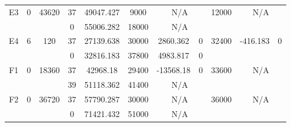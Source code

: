 \begin{sidewaystable}
\begin{tabular}{c||c|c||c|c|c|c|c||c|c|c}
         &
        
      \\
      \hline
      \multirow{2}{*}{E3} &
      \multirow{2}{*}{0} &
      \multirow{2}{*}{43620} &
      37 &
      49047.427 &
      9000 &
        \multicolumn{2}{|c||}{N/A} &
      \multirow{2}{*}{12000} &
        \multicolumn{2}{c}{\multirow{2}{*}{N/A}}
      \\
      \cline{4-8}
       &
       &
       &
      0 &
      55006.282 &
      18000 &
        \multicolumn{2}{|c||}{N/A} &
      
        
      \\
      \hline
      \multirow{2}{*}{E4} &
      \multirow{2}{*}{6} &
      \multirow{2}{*}{120} &
      37 &
      27139.638 &
      30000 &
        2860.362 &
        0 &
      \multirow{2}{*}{32400} &
        \multirow{2}{*}{-416.183} &
        \multirow{2}{*}{0}
      \\
      \cline{4-8}
       &
       &
       &
      0 &
      32816.183 &
      37800 &
        4983.817 &
        0 &
      
         &
        
      \\
      \hline
      \multirow{2}{*}{F1} &
      \multirow{2}{*}{0} &
      \multirow{2}{*}{18360} &
      37 &
      42968.18 &
      29400 &
        -13568.18 &
        0 &
      \multirow{2}{*}{33600} &
        \multicolumn{2}{c}{\multirow{2}{*}{N/A}}
      \\
      \cline{4-8}
       &
       &
       &
      39 &
      51118.362 &
      41400 &
        \multicolumn{2}{|c||}{N/A} &
      
        
      \\
      \hline
      \multirow{2}{*}{F2} &
      \multirow{2}{*}{0} &
      \multirow{2}{*}{36720} &
      37 &
      57790.287 &
      30000 &
        \multicolumn{2}{|c||}{N/A} &
      \multirow{2}{*}{36000} &
        \multicolumn{2}{c}{\multirow{2}{*}{N/A}}
      \\
      \cline{4-8}
       &
       &
       &
      0 &
      71421.432 &
      51000 &
        \multicolumn{2}{|c||}{N/A} &
      
        
      \\
\end{tabular}
\label{table:RDS2.txt-8940.tex} 
\end{sidewaystable}
